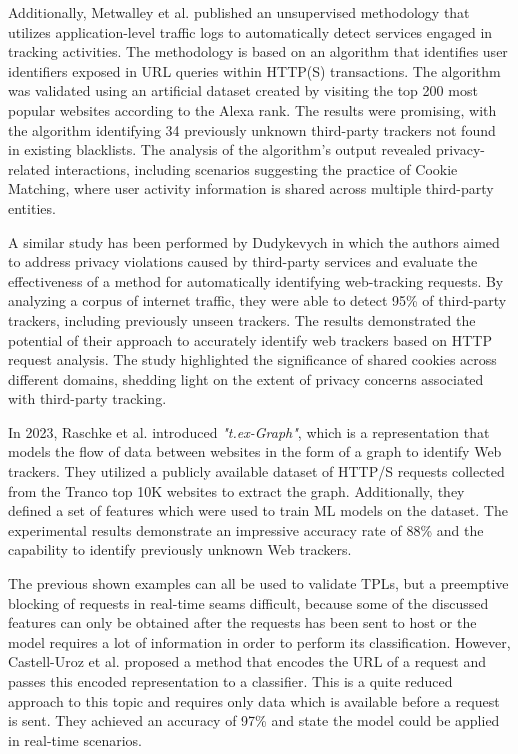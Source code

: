 Additionally, Metwalley et al. \cite{metwalley2015unsupervised} published an unsupervised methodology that utilizes application-level traffic logs to automatically
detect services engaged in tracking activities. The methodology is based on an algorithm that identifies user identifiers exposed
in URL queries within HTTP(S) transactions. The algorithm was validated using an artificial dataset created by visiting the top
200 most popular websites according to the Alexa rank. The results were promising, with the algorithm identifying 34 previously
unknown third-party trackers not found in existing blacklists. The analysis of the algorithm's output revealed privacy-related
interactions, including scenarios suggesting the practice of Cookie Matching, where user activity information is shared across
multiple third-party entities.

A similar study has been performed by Dudykevych \cite{dudykevych2016detecting} in which the authors aimed to address privacy violations caused by third-party services and evaluate the effectiveness
of a method for automatically identifying web-tracking requests. By analyzing a corpus of internet traffic, they were able
to detect 95\% of third-party trackers, including previously unseen trackers. The results demonstrated the potential of
their approach to accurately identify web trackers based on HTTP request analysis. The study highlighted the significance
of shared cookies across different domains, shedding light on the extent of privacy concerns associated with third-party tracking.

In 2023, Raschke et al. \cite{raschke2023} introduced \emph{"t.ex-Graph"}, which is a representation that models the flow of data
between websites in the form of a graph to identify Web trackers. They utilized a publicly available dataset
of HTTP/S requests collected from the Tranco top 10K websites to extract the graph. Additionally, they defined a set of features
which were used to train ML models on the dataset. The experimental results demonstrate an impressive accuracy rate of 88\% and the capability to identify previously unknown Web trackers.

The previous shown examples can all be used to validate TPLs, but a preemptive blocking of requests in real-time seams difficult, because some 
of the discussed features can only be obtained after the requests has been sent to host or the model requires a lot of information in order 
to perform its classification. However, Castell-Uroz et al. \cite{castell2020url} proposed a method that encodes the URL of a request and passes this
encoded representation to a classifier. This is a quite reduced approach to this topic and requires only data which is available before a request
is sent. They achieved an accuracy of 97\% and state the model could be applied in real-time scenarios.

